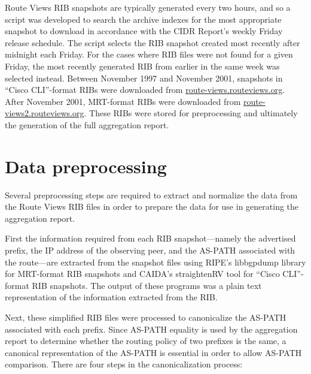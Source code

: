 Route Views RIB snapshots are typically generated every two hours, and so a script was developed to search the archive indexes for the most appropriate snapshot to download in accordance with the CIDR Report's weekly Friday release schedule. The script selects the RIB snapshot created most recently after midnight each Friday. For the cases where RIB files were not found for a given Friday, the most recently generated RIB from earlier in the same week was selected instead. Between November 1997 and November 2001, snapshots in ``Cisco CLI''-format RIBs were downloaded from \url{route-views.routeviews.org}. After November 2001, MRT-format RIBs were downloaded from \url{route-views2.routeviews.org}. These RIBs were stored for preprocessing and ultimately the generation of the full aggregation report.

\section{Data preprocessing}

Several preprocessing steps are required to extract and normalize the data from the Route Views RIB files in order to prepare the data for use in generating the aggregation report.

First the information required from each RIB snapshot---namely the advertised prefix, the IP address of the observing peer, and the AS-PATH associated with the route---are extracted from the snapshot files using RIPE's libbgpdump library \cite{libbgpdump} for MRT-format RIB snapshots and CAIDA's straightenRV tool \cite{straightenrv} for ``Cisco CLI''-format RIB snapshots. The output of these programs was a plain text representation of the information extracted from the RIB.

Next, these simplified RIB files were processed to canonicalize the AS-PATH associated with each prefix. Since AS-PATH equality is used by the aggregation report to determine whether the routing policy of two prefixes is the same, a canonical representation of the AS-PATH is essential in order to allow AS-PATH comparison. There are four steps in the canonicalization process:

